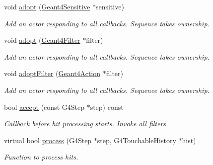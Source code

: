 \begin{DoxyCompactItemize}
void \hyperlink{class_d_d4hep_1_1_simulation_1_1_geant4_sens_det_action_sequence_a01437840682e0edbee69d11c99f73b5f}{adopt} (\hyperlink{class_d_d4hep_1_1_simulation_1_1_geant4_sensitive}{Geant4Sensitive} $\ast$sensitive)
\begin{DoxyCompactList}\small\item\em Add an actor responding to all callbacks. Sequence takes ownership. \item\end{DoxyCompactList}\item 
void \hyperlink{class_d_d4hep_1_1_simulation_1_1_geant4_sens_det_action_sequence_a89fcbc8c65a95890ea349087ac4834ec}{adopt} (\hyperlink{class_d_d4hep_1_1_simulation_1_1_geant4_filter}{Geant4Filter} $\ast$filter)
\begin{DoxyCompactList}\small\item\em Add an actor responding to all callbacks. Sequence takes ownership. \item\end{DoxyCompactList}\item 
void \hyperlink{class_d_d4hep_1_1_simulation_1_1_geant4_sens_det_action_sequence_ae387c8632412ef9eec6ed9767d3ea01b}{adoptFilter} (\hyperlink{class_d_d4hep_1_1_simulation_1_1_geant4_action}{Geant4Action} $\ast$filter)
\begin{DoxyCompactList}\small\item\em Add an actor responding to all callbacks. Sequence takes ownership. \item\end{DoxyCompactList}\item 
bool \hyperlink{class_d_d4hep_1_1_simulation_1_1_geant4_sens_det_action_sequence_a91a3ce22bc0e78c28496e77113596829}{accept} (const G4Step $\ast$step) const 
\begin{DoxyCompactList}\small\item\em \hyperlink{class_d_d4hep_1_1_callback}{Callback} before hit processing starts. Invoke all filters. \item\end{DoxyCompactList}\item 
virtual bool \hyperlink{class_d_d4hep_1_1_simulation_1_1_geant4_sens_det_action_sequence_a452bc5bf7c03c8b546d3459ba7bf7e36}{process} (G4Step $\ast$step, G4TouchableHistory $\ast$hist)
\begin{DoxyCompactList}\small\item\em Function to process hits. \item\end{DoxyCompactList}\item 

\end{DoxyCompactItemize}
